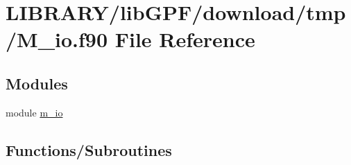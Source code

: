 \hypertarget{M__io_8f90}{}\section{L\+I\+B\+R\+A\+R\+Y/lib\+G\+P\+F/download/tmp/\+M\+\_\+io.f90 File Reference}
\label{M__io_8f90}
\subsection*{Modules}
\begin{DoxyCompactItemize}
\item 
module \hyperlink{namespacem__io}{m\+\_\+io}
\end{DoxyCompactItemize}
\subsection*{Functions/\+Subroutines}
